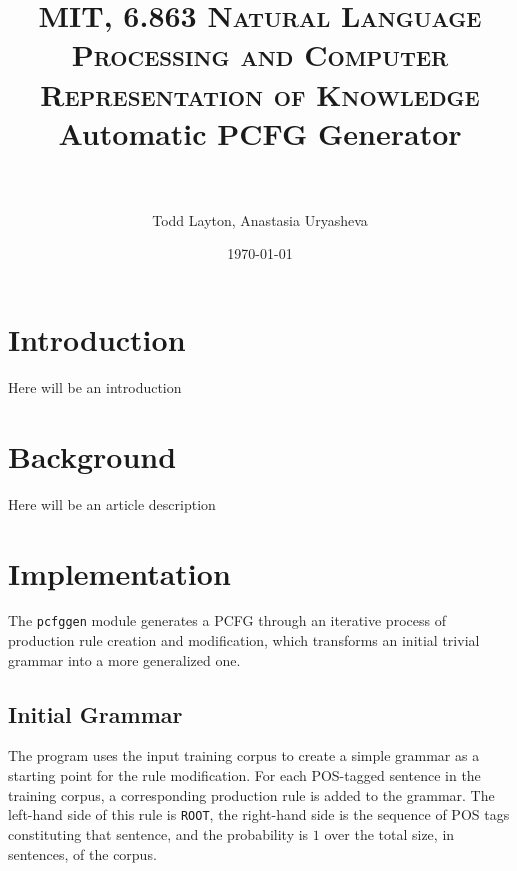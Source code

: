 \documentclass[paper=a4, fontsize=11pt]{scrartcl} %
\title{	
\normalfont \normalsize 
\textsc{MIT, 6.863 Natural Language Processing and Computer Representation of Knowledge}
\horrule{0.5pt} \\[0.4cm] %
\huge Automatic PCFG Generator \\ %
\horrule{2pt} \\[0.5cm] %
}
\author {Todd Layton, Anastasia Uryasheva}
\date{\normalsize\today}
\numberwithin{equation}{section} %
\numberwithin{figure}{section} %
\numberwithin{table}{section} %
\begin{document}
\maketitle %


\section{Introduction}

Here will be an introduction


\section{Background}

Here will be an article description


\section{Implementation}

The \texttt{pcfggen} module generates a PCFG through an iterative process of production rule creation and modification, which transforms an initial trivial grammar into a more generalized one.

\subsection{Initial Grammar}

The program uses the input training corpus to create a simple grammar as a starting point for the rule modification. For each POS-tagged sentence in the training corpus, a corresponding production rule is added to the grammar. The left-hand side of this rule is \texttt{ROOT}, the right-hand side is the sequence of POS tags constituting that sentence, and the probability is $1$ over the total size, in sentences, of the corpus.
\end{document}
